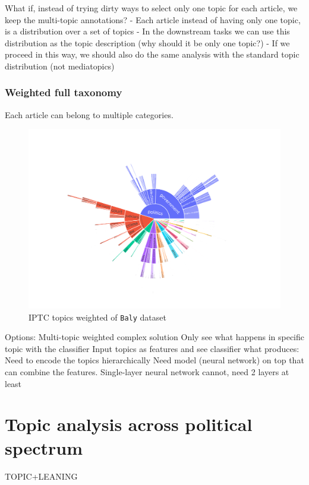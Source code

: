What if, instead of trying dirty ways to select only one topic for each article, we keep the multi-topic annotations?
- Each article instead of having only one topic, is a distribution over a set of topics
- In the downstream tasks we can use this distribution as the topic description (why should it be only one topic?)
- If we proceed in this way, we should also do the same analysis with the standard topic distribution (not mediatopics)


\subsubsection{Weighted full taxonomy}
Each article can belong to multiple categories.

\begin{figure}[!htbp]
    \centering
    \includegraphics[width=\linewidth]{figures/baly_iptc_weighted.pdf}
    \caption{IPTC topics weighted of \texttt{Baly} dataset}
    \label{fig:baly_iptc_weighted}
\end{figure}


Options:
Multi-topic weighted complex solution
Only see what happens in specific topic with the classifier
Input topics as features and see classifier what produces:
Need to encode the topics hierarchically
Need model (neural network) on top that can combine the features. Single-layer neural network cannot, need 2 layers at least



\section{Topic analysis across political spectrum}
\label{sec:topics_topics_leaning}
TOPIC+LEANING

